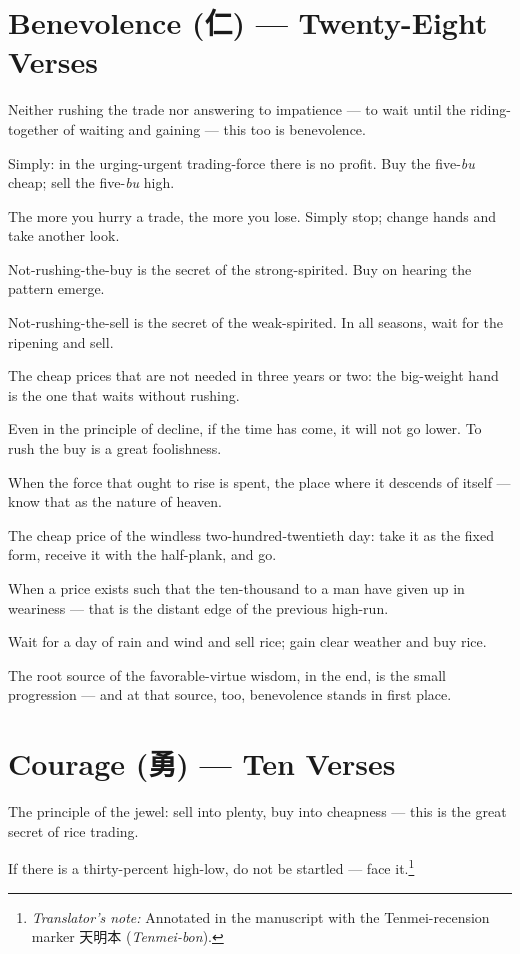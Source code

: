 \documentclass[10pt, openany]{book}
\newcommand{\jp}[1]{{\japanesefont #1}}
\newcommand{\tn}[1]{\footnote{\textit{Translator's note:} #1}}
\newcommand{\jt}[2]{\jp{#1} (\textit{#2})}
\begin{document}
\section{Benevolence (\jp{仁}) --- Twenty-Eight Verses}

Neither rushing the trade nor answering to impatience --- to wait
until the riding-together of waiting and gaining --- this too is
benevolence.

Simply: in the urging-urgent trading-force there is no profit.
Buy the five-\textit{bu} cheap; sell the five-\textit{bu} high.

The more you hurry a trade, the more you lose. Simply stop; change
hands and take another look.

Not-rushing-the-buy is the secret of the strong-spirited. Buy on
hearing the pattern emerge.

Not-rushing-the-sell is the secret of the weak-spirited. In all
seasons, wait for the ripening and sell.

The cheap prices that are not needed in three years or two: the
big-weight hand is the one that waits without rushing.

Even in the principle of decline, if the time has come, it will
not go lower. To rush the buy is a great foolishness.

When the force that ought to rise is spent, the place where it
descends of itself --- know that as the nature of heaven.

The cheap price of the windless two-hundred-twentieth day: take
it as the fixed form, receive it with the half-plank, and go.

When a price exists such that the ten-thousand to a man have given
up in weariness --- that is the distant edge of the previous
high-run.

Wait for a day of rain and wind and sell rice; gain clear weather
and buy rice.

The root source of the favorable-virtue wisdom, in the end, is the
small progression --- and at that source, too, benevolence stands
in first place.

\section{Courage (\jp{勇}) --- Ten Verses}

The principle of the jewel: sell into plenty, buy into cheapness
--- this is the great secret of rice trading.

If there is a thirty-percent high-low, do not be startled --- face
it.\tn{Annotated in the manuscript with the Tenmei-recension
marker \jt{天明本}{Tenmei-bon}.}
\end{document}
